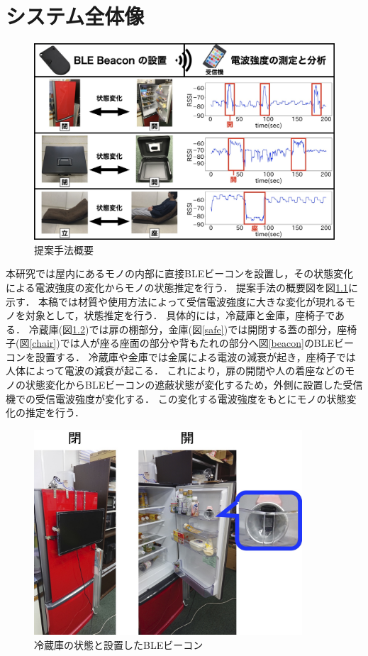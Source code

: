 \chapter{システム全体像}
\thispagestyle{myheadings}

\begin{figure}[tbh]
    \centering
    \includegraphics[width=14cm]{images/chapter3/abst.jpg}
    \caption{提案手法概要}
    \label{abst-chap3}
\end{figure}

本研究では屋内にあるモノの内部に直接BLEビーコンを設置し，その状態変化による電波強度の変化からモノの状態推定を行う．
提案手法の概要図を図\ref{abst-chap3}に示す．
本稿では材質や使用方法によって受信電波強度に大きな変化が現れるモノを対象として，状態推定を行う．
具体的には，冷蔵庫と金庫，座椅子である．
冷蔵庫(図\ref{freezer})では扉の棚部分，金庫(図\ref{safe})では開閉する蓋の部分，座椅子(図\ref{chair})では人が座る座面の部分や背もたれの部分へ図\ref{beacon}のBLEビーコンを設置する．
冷蔵庫や金庫では金属による電波の減衰が起き，座椅子では人体によって電波の減衰が起こる．
これにより，扉の開閉や人の着座などのモノの状態変化からBLEビーコンの遮蔽状態が変化するため，外側に設置した受信機での受信電波強度が変化する．
この変化する電波強度をもとにモノの状態変化の推定を行う．



\begin{figure}[H]
    \centering
    \includegraphics[width=10cm]{images/chapter3/regisW2.jpg}
    \caption{冷蔵庫の状態と設置したBLEビーコン}
    \label{freezer}
\end{figure}


